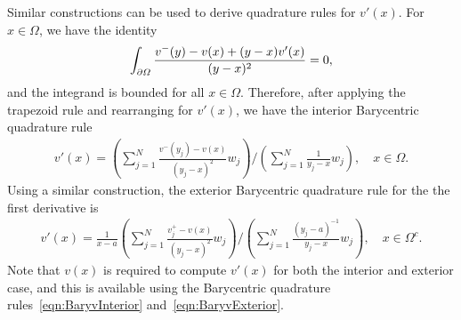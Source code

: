 \documentclass{jfm}
\begin{document}
Similar constructions can be used to derive quadrature rules
for $v'(x)$.  For $x \in \Omega$, we have the identity
\begin{align}
  \int_{{\partial}\varOmega} \frac{v^-(y) - v(x) + (y-x)v'(x)}{(y - x)^2} = 0,
\end{align}
and the integrand is bounded for all $x \in \Omega$.  Therefore, after
applying the trapezoid rule and rearranging for $v'(x)$, we have the
interior Barycentric quadrature rule
\begin{align}
  v'(x) = \left(\sum_{j=1}^{N}
    \frac{v^{-}(y_j) - v(x)}{(y_j-x)^2} w_j \right)
  \Bigg/
  \left(\sum_{j=1}^{N} \frac{1}{y_j-x} w_j\right), 
  \quad x \in \Omega.
  \label{eqn:BaryvprimeInterior}
\end{align}
Using a similar construction, the exterior Barycentric quadrature rule
for the the first derivative is
\begin{align}
  v'(x) = \frac{1}{x-a} \left(\sum_{j=1}^N
    \frac{v^+_j - v(x)}{(y_j - x)^2} w_j \right)
    \Bigg/
    \left(\sum_{j=1}^N \frac{(y_j-a)^{-1}}{y_j - x} w_j\right),
    \quad x \in \Omega^c.
  \label{eqn:BaryvprimeExterior}
\end{align}
Note that $v(x)$ is required to compute $v'(x)$ for both the interior
and exterior case, and this is available using the Barycentric
quadrature rules~\eqref{eqn:BaryvInterior}
and~\eqref{eqn:BaryvExterior}.
\end{document}
